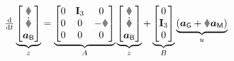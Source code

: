 \begin{align}\label{eq:AccelerometerDynamicsState}
 \tdiff{t}
 \underbrace{\begin{bmatrix} \r \\ \rd \\ \aIMUB \end{bmatrix}}_{z}
 &=
 \underbrace{\begin{bmatrix} 0 & \idMat[3] & 0 \\ 0 & 0 & -\R \\ 0 & 0 & 0 \end{bmatrix}}_{A}
 \underbrace{\begin{bmatrix} \r \\ \rd \\ \aIMUB \end{bmatrix}}_{z}
 +
 \underbrace{\begin{bmatrix} 0 \\ \idMat[3] \\ 0 \end{bmatrix}}_{B}
 \underbrace{(\gravityAcc + \R \aIMU)}_{u}
\end{align}


